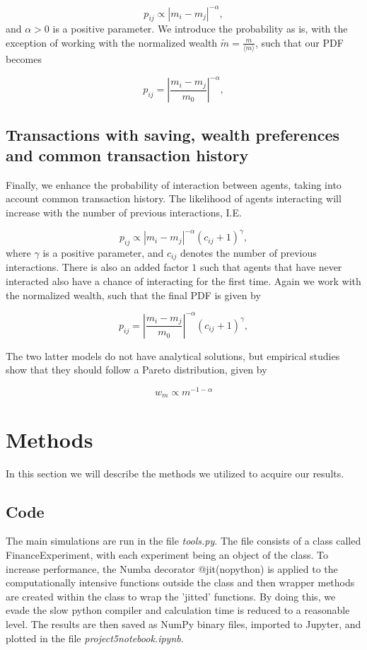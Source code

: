 \documentclass{emulateapj}
\begin{document}
\begin{equation}
p_{ij} \propto \left|m_i-m_j \right|^{-\alpha},
\end{equation}
and $\alpha > 0$ is a positive parameter. We introduce the probability as is, with the exception of working with the normalized wealth $\tilde{m} = \frac{m}{\langle m \rangle}$, such that our PDF becomes

\begin{equation}
p_{ij} = \left|\frac{m_i-m_j}{m_0} \right|^{-\alpha},
\end{equation}

\subsection{Transactions with saving, wealth preferences and common transaction history}
Finally, we enhance the probability of interaction between agents, taking into account common transaction history. The likelihood of agents interacting will increase with the number of previous interactions, I.E.

\begin{equation}
p_{ij} \propto \left|m_i-m_j \right|^{-\alpha} \left(c_{ij} + 1\right)^\gamma,
\end{equation}
where $\gamma$ is a positive parameter, and $c_{ij}$ denotes the number of previous interactions. There is also an added factor $1$ such that agents that have never interacted also have a chance of interacting for the first time. Again we work with the normalized wealth, such that the final PDF is given by

\begin{equation}
p_{ij} = \left|\frac{m_i-m_j}{m_0} \right|^{-\alpha} \left(c_{ij} + 1\right)^\gamma,
\end{equation}

The two latter models do not have analytical solutions, but empirical studies show that they should follow a Pareto distribution, given by

\begin{equation}
w_m \propto m^{-1-\alpha}
\end{equation}

\section{Methods}
\label{sec:methods}
In this section we will describe the methods we utilized to acquire our results.


\subsection{Code}
The main simulations are run in the file \textit{tools.py}. The file consists of a class called FinanceExperiment, with each experiment being an object of the class. To increase performance, the Numba decorator @jit(nopython) is applied to the computationally intensive functions outside the class and then wrapper methods are created within the class to wrap the 'jitted' functions. By doing this, we evade the slow python compiler and calculation time is reduced to a reasonable level. The results are then saved as NumPy binary files, imported to Jupyter, and plotted in the file \textit{project5notebook.ipynb}.
\end{document}
